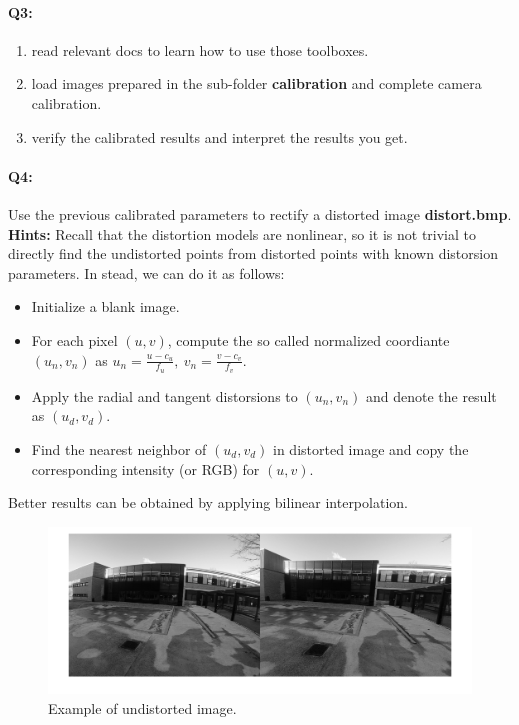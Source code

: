 \documentclass[a4paper]{article}
\begin{document}
\paragraph{Q3:} 
\begin{enumerate}
\item read relevant docs to learn how to use those toolboxes.
\item load images prepared in the sub-folder \textbf{calibration} and complete camera calibration.
\item verify the calibrated results and interpret the results you get.
\end{enumerate}
\paragraph{Q4:} 
Use the previous calibrated parameters to rectify a distorted image \textbf{distort.bmp}. 
\textbf{Hints:}
Recall that the distortion models are nonlinear, so it is not trivial to directly find the undistorted points from distorted points with known distorsion parameters. In stead, we can do it as follows:
\begin{itemize}
	\item Initialize a blank image.
	\item For each pixel $(u,v)$, compute the so called normalized coordiante $(u_n,v_n)$ as $u_n=\frac{u-c_u}{f_u},\ v_n=\frac{v-c_v}{f_v}$.
	\item Apply the radial and tangent distorsions to $(u_n,v_n)$ and denote the result as $(u_d,v_d)$.
	\item Find the nearest neighbor of $(u_d,v_d)$ in distorted image and copy the corresponding intensity (or RGB) for $(u,v)$. 
\end{itemize}
Better results can be obtained by applying bilinear interpolation.
\begin{figure}[!b]
\centering
\includegraphics[scale=0.2]{figures/rec.png}
\caption{Example of undistorted image.}
\end{figure}
\end{document}
